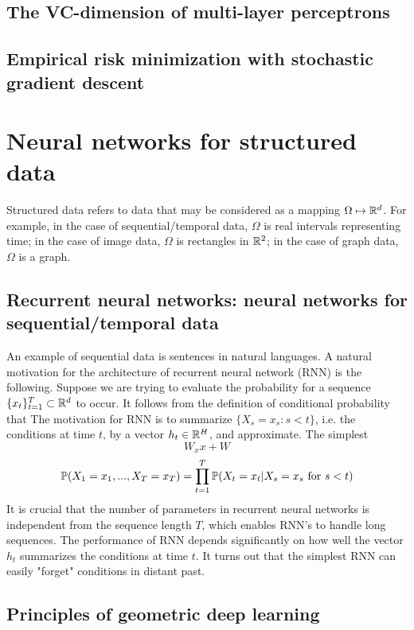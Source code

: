\documentclass{article}
\begin{document}
\subsection{The VC-dimension of multi-layer perceptrons}

\subsection{Empirical risk minimization with stochastic gradient descent}

\section{Neural networks for structured data}

Structured data refers to data that may be considered as a mapping $\Omega \mapsto {\mathbb R}^d$.
For example, in the case of sequential/temporal data, $\Omega$ is real intervals representing time;
in the case of image data, $\Omega$ is rectangles in ${\mathbb R}^2$;
in the case of graph data, $\Omega$ is a graph.

\subsection{Recurrent neural networks: neural networks for sequential/temporal data}

An example of sequential data is sentences in natural languages.
A natural motivation for the architecture of recurrent neural network (RNN) is the following.
Suppose we are trying to evaluate the probability for a sequence $\{x_t\}_{t = 1}^T \subset {\mathbb R}^d$ to occur.
It follows from the definition of conditional probability that
The motivation for RNN is to summarize $\{X_s = x_s : s < t\}$, i.e. the conditions at time $t$, by a vector $h_t \in {\mathbb R}^H$, and approximate.
The simplest
\[
W_x x + W
\]
\[
{\mathbb P} (X_1 = x_1, ..., X_T = x_T)
= \prod_{t = 1}^T {\mathbb P} (X_t = x_t | X_s = x_s\ \text{for}\ s < t)
\]
It is crucial that the number of parameters in recurrent neural networks is independent from the sequence length $T$, which enables RNN's to handle long sequences.
The performance of RNN depends significantly on how well the vector $h_t$ summarizes the conditions at time $t$.
It turns out that the simplest RNN can easily "forget" conditions in distant past.

\subsection{Principles of geometric deep learning}
\end{document}
